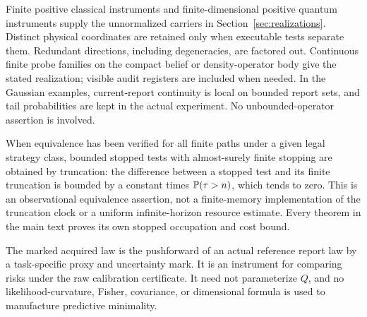 Finite positive classical instruments and finite-dimensional positive quantum instruments supply the unnormalized carriers in Section~\ref{sec:realizations}. Distinct physical coordinates are retained only when executable tests separate them. Redundant directions, including degeneracies, are factored out. Continuous finite probe families on the compact belief or density-operator body give the stated realization; visible audit registers are included when needed. In the Gaussian examples, current-report continuity is local on bounded report sets, and tail probabilities are kept in the actual experiment. No unbounded-operator assertion is involved.

When equivalence has been verified for all finite paths under a given legal strategy class, bounded stopped tests with almost-surely finite stopping are obtained by truncation: the difference between a stopped test and its finite truncation is bounded by a constant times $\mathbb P(\tau>n)$, which tends to zero. This is an observational equivalence assertion, not a finite-memory implementation of the truncation clock or a uniform infinite-horizon resource estimate. Every theorem in the main text proves its own stopped occupation and cost bound.

The marked acquired law is the pushforward of an actual reference report law by a task-specific proxy and uncertainty mark. It is an instrument for comparing risks under the raw calibration certificate. It need not parameterize $Q$, and no likelihood-curvature, Fisher, covariance, or dimensional formula is used to manufacture predictive minimality.
